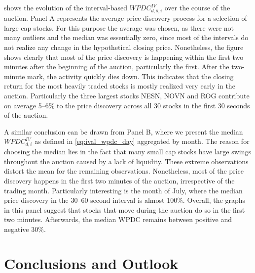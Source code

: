 \documentclass[11pt,a4paper, notitlepage]{article}
\begin{document}
	
	 shows the evolution of the interval-based $WPDC^{IV}_{d,\hat{s},i}$ over the course of the auction. Panel A represents the average price discovery process for a selection of large cap stocks. For this purpose the average was chosen, as there were not many outliers and the median was essentially zero, since most of the intervals do not realize any change in the hypothetical closing price. Nonetheless, the figure shows clearly that most of the price discovery is happening within the first two minutes after the beginning of the auction, particularly the first. After the two-minute mark, the activity quickly dies down. This indicates that the closing return for the most heavily traded stocks is mostly realized very early in the auction. Particularly the three largest stocks NESN, NOVN and ROG contribute on average 5--6\% to the price discovery across all 30 stocks in the first 30 seconds of the auction.
	
	A similar conclusion can be drawn from Panel B, where we present the median $WPDC^{IV}_{d,i}$ as defined in \cref{eq:ival_wpdc_day} aggregated by month. The reason for choosing the median lies in the fact that many small cap stocks have large swings throughout the auction caused by a lack of liquidity. These extreme observations distort the mean for the remaining observations. Nonetheless, most of the price discovery happens in the first two minutes of the auction, irrespective of the trading month. Particularly interesting is the month of July, where the median price discovery in the 30--60 second interval is almost 100\%. Overall, the graphs in this panel suggest that stocks that move during the auction do so in the first two minutes. Afterwards, the median WPDC remains between positive and negative 30\%.
	
	
	\section{Conclusions and Outlook} \label{sec:outlook}
	
\end{document}
